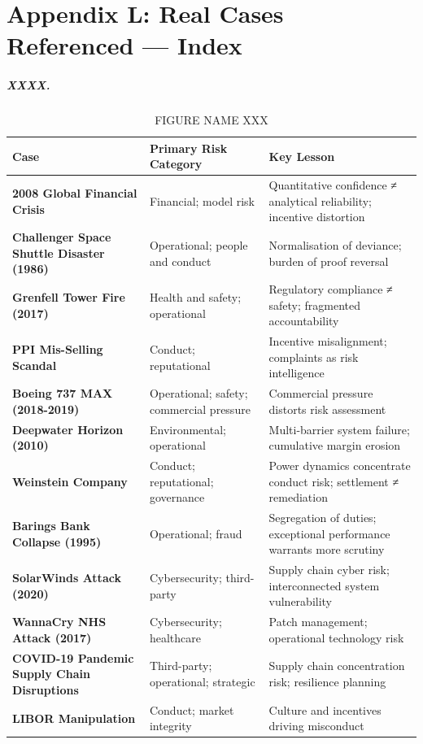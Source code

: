 \chapter*{Appendix L: Real Cases Referenced — Index}
\label{chap:Appendix L: Real Cases Referenced — Index}

\paragraph{XXXX.}

\begin{table}[H]
  \centering
  \renewcommand{\arraystretch}{1.5}
  \begin{tabularx}{\textwidth}{ | >{\raggedright\arraybackslash}p{} 
								| >{\raggedright\arraybackslash}p{} 
                                | >{\raggedright\arraybackslash}X | }
    \hline
    \textbf{Case} & \textbf{Primary Risk Category} & \textbf{Key Lesson} \\
    \hline
    \textbf{2008 Global Financial Crisis} & Financial; model risk & Quantitative confidence ≠ analytical reliability; incentive distortion\\
    \hline
    \textbf{Challenger Space Shuttle Disaster (1986)} & Operational; people and conduct & Normalisation of deviance; burden of proof reversal\\
    \hline
    \textbf{Grenfell Tower Fire (2017)} & Health and safety; operational & Regulatory compliance ≠ safety; fragmented accountability\\
    \hline
    \textbf{PPI Mis-Selling Scandal} & Conduct; reputational & Incentive misalignment; complaints as risk intelligence\\
    \hline
    \textbf{Boeing 737 MAX (2018-2019)} & Operational; safety; commercial pressure & Commercial pressure distorts risk assessment\\
    \hline
    \textbf{Deepwater Horizon (2010)} & Environmental; operational & Multi-barrier system failure; cumulative margin erosion\\
    \hline
    \textbf{Weinstein Company} & Conduct; reputational; governance & Power dynamics concentrate conduct risk; settlement ≠ remediation\\
    \hline
    \textbf{Barings Bank Collapse (1995)} & Operational; fraud & Segregation of duties; exceptional performance warrants more scrutiny\\
    \hline
    \textbf{SolarWinds Attack (2020)} & Cybersecurity; third-party & Supply chain cyber risk; interconnected system vulnerability\\
    \hline
    \textbf{WannaCry NHS Attack (2017)} & Cybersecurity; healthcare & Patch management; operational technology risk\\
    \hline
    \textbf{COVID-19 Pandemic Supply Chain Disruptions} & Third-party; operational; strategic & Supply chain concentration risk; resilience planning\\
    \hline
    \textbf{LIBOR Manipulation} & Conduct; market integrity & Culture and incentives driving misconduct\\
    \hline
  \end{tabularx}
  \caption{FIGURE NAME XXX}
\end{table}